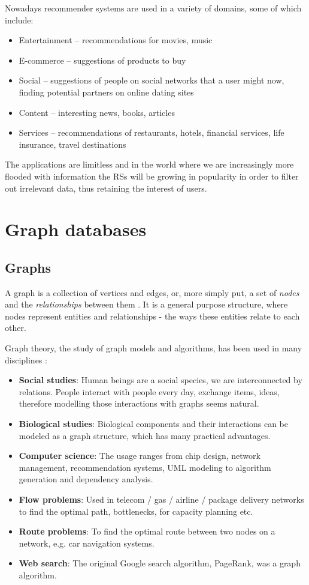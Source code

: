 \documentclass[12pt]{report}
\begin{document}
Nowadays recommender systems are used in a variety of domains, some of which include:
\begin{itemize}
\item Entertainment -- recommendations for movies, music
\item E-commerce -- suggestions of products to buy
\item Social -- suggestions of people on social networks that a user might now, finding potential partners on online dating sites
\item Content -- interesting news, books, articles
\item Services -- recommendations of restaurants, hotels, financial services, life insurance, travel destinations
\end{itemize}

The applications are limitless and in the world where we are increasingly more flooded with information the RSs will be growing in popularity in order to filter out irrelevant data, thus retaining the interest of users.

\section{Graph databases}

\subsection{Graphs}

A graph is a collection of vertices and edges, or, more simply put, a set of \textit{nodes} and the \textit{relationships} between them \cite{graph_databases}. It is a general purpose structure, where nodes represent entities and relationships - the ways these entities relate to each other.

Graph theory, the study of graph models and algorithms, has been used in many disciplines \cite{learning_neo4j}:
\begin{itemize}
\item {\bf Social studies}: Human beings are a social species, we are interconnected by relations. People interact with people every day, exchange items, ideas, therefore modelling those interactions with graphs seems natural.
\item {\bf Biological studies}: Biological components and their interactions can be modeled as a graph structure, which has many practical advantages.
\item {\bf Computer science}: The usage ranges from chip design, network management, recommendation systems, UML modeling to algorithm generation and dependency analysis.
\item {\bf Flow problems}: Used in telecom / gas / airline / package delivery networks to find the optimal path, bottlenecks, for capacity planning etc. 
\item {\bf Route problems}: To find the optimal route between two nodes on a network, e.g. car navigation systems.
\item {\bf Web search}: The original Google search algorithm, PageRank, was a graph algorithm.
\end{itemize}
\end{document}
